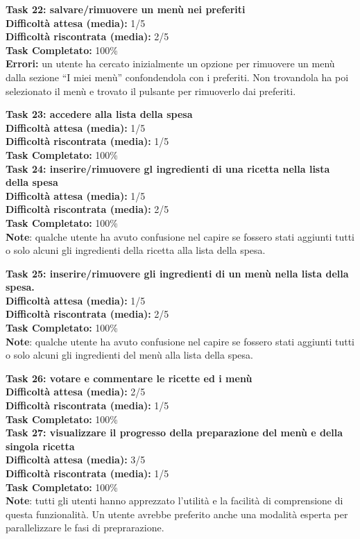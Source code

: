 \begin{itemize}
\textbf{Task 22: salvare/rimuovere un menù nei preferiti}\\
\textbf{Difficoltà attesa (media):} 1/5\\
\textbf{Difficoltà riscontrata (media):} 2/5\\
\textbf{Task Completato:} 100\%\\
\textbf{Errori:} un utente ha cercato inizialmente un opzione per
rimuovere un menù dalla sezione ``I miei menù'' confondendola con i
preferiti. Non trovandola ha
poi selezionato il menù e trovato il pulsante per rimuoverlo dai
preferiti.

\textbf{Task 23: accedere alla lista della spesa}\\
\textbf{Difficoltà attesa (media):} 1/5\\
\textbf{Difficoltà riscontrata (media):} 1/5\\
\textbf{Task Completato:} 100\%\\

\textbf{Task 24: inserire/rimuovere gl ingredienti di una ricetta nella
lista della spesa}\\
\textbf{Difficoltà attesa (media):} 1/5\\
\textbf{Difficoltà riscontrata (media):} 2/5\\
\textbf{Task Completato:} 100\%\\
\textbf{Note}: qualche utente ha avuto confusione nel capire se fossero
stati aggiunti tutti o solo alcuni gli ingredienti della ricetta alla
lista della spesa.

\textbf{Task 25: inserire/rimuovere gli ingredienti di un menù nella
lista della spesa.}\\
\textbf{Difficoltà attesa (media):} 1/5\\
\textbf{Difficoltà riscontrata (media):} 2/5\\
\textbf{Task Completato:} 100\%\\
\textbf{Note}: qualche utente ha avuto confusione nel capire se fossero
stati aggiunti tutti o solo alcuni gli ingredienti del menù alla lista
della spesa.

\textbf{Task 26: votare e commentare le ricette ed i menù}\\
\textbf{Difficoltà attesa (media):} 2/5\\
\textbf{Difficoltà riscontrata (media):} 1/5\\
\textbf{Task Completato:} 100\%\\

\textbf{Task 27: visualizzare il progresso della preparazione del menù e
della singola ricetta}\\
\textbf{Difficoltà attesa (media):} 3/5\\
\textbf{Difficoltà riscontrata (media):} 1/5\\
\textbf{Task Completato:} 100\%\\
\textbf{Note}: tutti gli utenti hanno apprezzato l'utilità e la facilità
di comprensione di questa funzionalità. Un utente avrebbe preferito
anche una modalità esperta per parallelizzare le fasi di preprarazione.


\end{itemize}
